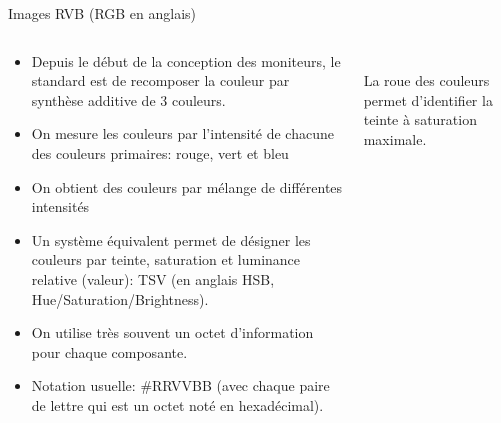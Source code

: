 \begin{frame}[fragile]{Images RVB (RGB en anglais)}
  \begin{columns}
    \begin{column}{.6\linewidth}
      \begin{itemize}
      \item Depuis le début de la conception des moniteurs, le standard est de
        recomposer la couleur par synthèse additive de 3 couleurs.
      \item On mesure les couleurs par l'intensité de chacune des couleurs
        primaires: rouge, vert et bleu
      \item On obtient des couleurs par mélange de différentes intensités
      \item Un système équivalent permet de désigner les couleurs par teinte,
        saturation et luminance relative (valeur): TSV (en anglais HSB,
        Hue/Saturation/Brightness).
      \item On utilise très souvent un octet d'information pour chaque
        composante.
      \item Notation usuelle: \#RRVVBB (avec chaque paire de lettre qui est un
        octet noté en hexadécimal).
      \end{itemize}
    \end{column}%
    \begin{column}{.4\linewidth}\centering
      \\
      La roue des couleurs permet d'identifier la teinte à saturation
      maximale.
    \end{column}
  \end{columns}
\end{frame}
